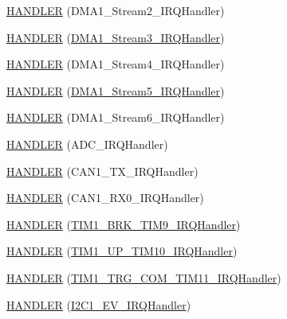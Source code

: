 \begin{DoxyCompactItemize}
\item 
\hyperlink{group___p_i_o_s_ga951ef6b9669d7229cc20eb36c4ed6d76}{\-H\-A\-N\-D\-L\-E\-R} (\-D\-M\-A1\-\_\-\-Stream2\-\_\-\-I\-R\-Q\-Handler)
\item 
\hyperlink{group___p_i_o_s_ga5a835df41056ec1fe998c5b2df30f8b1}{\-H\-A\-N\-D\-L\-E\-R} (\hyperlink{group___revolution_ga51d485393cf37043623c8bd0abae12a1}{\-D\-M\-A1\-\_\-\-Stream3\-\_\-\-I\-R\-Q\-Handler})
\item 
\hyperlink{group___p_i_o_s_gae2ae9fe1b7fbbac27ceaf8c085255ea7}{\-H\-A\-N\-D\-L\-E\-R} (\-D\-M\-A1\-\_\-\-Stream4\-\_\-\-I\-R\-Q\-Handler)
\item 
\hyperlink{group___p_i_o_s_ga91d06149cb05850dc812b4a3f8fcdf6f}{\-H\-A\-N\-D\-L\-E\-R} (\hyperlink{group___w_a_v_e_p_l_a_y_e_r___private___variables_gac201b60d58b0eba2ce0b55710eb3c4d0}{\-D\-M\-A1\-\_\-\-Stream5\-\_\-\-I\-R\-Q\-Handler})
\item 
\hyperlink{group___p_i_o_s_gaa0728c2b9fc9dc457309d801d78e95bd}{\-H\-A\-N\-D\-L\-E\-R} (\-D\-M\-A1\-\_\-\-Stream6\-\_\-\-I\-R\-Q\-Handler)
\item 
\hyperlink{group___p_i_o_s_gaeaae2b77eadbeae6679c9c80abe4af1e}{\-H\-A\-N\-D\-L\-E\-R} (\-A\-D\-C\-\_\-\-I\-R\-Q\-Handler)
\item 
\hyperlink{group___p_i_o_s_gaeea8d0e1d22529cde3b6e3257c391136}{\-H\-A\-N\-D\-L\-E\-R} (\-C\-A\-N1\-\_\-\-T\-X\-\_\-\-I\-R\-Q\-Handler)
\item 
\hyperlink{group___p_i_o_s_ga7453b7196fb31ff23a32f771aef37a4e}{\-H\-A\-N\-D\-L\-E\-R} (\-C\-A\-N1\-\_\-\-R\-X0\-\_\-\-I\-R\-Q\-Handler)
\item 
\hyperlink{group___p_i_o_s_gad650c0d1f4898574c29120ac55a2546f}{\-H\-A\-N\-D\-L\-E\-R} (\hyperlink{group___p_i_o_s___t_i_m_ga3b60f6118cdd3449f4ed29fde4704236}{\-T\-I\-M1\-\_\-\-B\-R\-K\-\_\-\-T\-I\-M9\-\_\-\-I\-R\-Q\-Handler})
\item 
\hyperlink{group___p_i_o_s_gaae58b36fbe035659376ee656ebdcab07}{\-H\-A\-N\-D\-L\-E\-R} (\hyperlink{group___p_i_o_s___t_i_m_gad1fd361bc5ad89facee67c76d1ff8dc0}{\-T\-I\-M1\-\_\-\-U\-P\-\_\-\-T\-I\-M10\-\_\-\-I\-R\-Q\-Handler})
\item 
\hyperlink{group___p_i_o_s_gacc5fee09d8594fbce1941ddb36631718}{\-H\-A\-N\-D\-L\-E\-R} (\hyperlink{group___p_i_o_s___t_i_m_ga098245bf4e2f8844b22692b034a266fb}{\-T\-I\-M1\-\_\-\-T\-R\-G\-\_\-\-C\-O\-M\-\_\-\-T\-I\-M11\-\_\-\-I\-R\-Q\-Handler})
\item 
\hyperlink{group___p_i_o_s_ga1783b0468c1bdb51696e3fa7484d15d9}{\-H\-A\-N\-D\-L\-E\-R} (\hyperlink{group___revo_mini_gad0e17b57fe51ed2861178f06899345c0}{\-I2\-C1\-\_\-\-E\-V\-\_\-\-I\-R\-Q\-Handler})

\end{DoxyCompactItemize}
